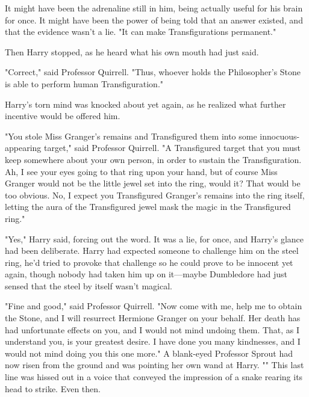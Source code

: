 It might have been the adrenaline still in him, being actually useful for his 
brain for once. It might have been the power of being told that an answer 
existed, and that the evidence wasn't a lie. "It can make Transfigurations 
permanent."

Then Harry stopped, as he heard what his own mouth had just said.

"Correct," said Professor Quirrell. "Thus, whoever holds the Philosopher's 
Stone is able to perform human Transfiguration."

Harry's torn mind was knocked about yet again, as he realized what further 
incentive would be offered him.

"You stole Miss Granger's remains and Transfigured them into some 
innocuous-appearing target," said Professor Quirrell. "A Transfigured target 
that you must keep somewhere about your own person, in order to sustain the 
Transfiguration. Ah, I see your eyes going to that ring upon your hand, but of 
course Miss Granger would not be the little jewel set into the ring, would it? 
That would be too obvious. No, I expect you Transfigured Granger's remains into 
the ring itself, letting the aura of the Transfigured jewel mask the magic in 
the Transfigured ring."

"Yes," Harry said, forcing out the word. It was a lie, for once, and Harry's 
glance had been deliberate. Harry had expected someone to challenge him on the 
steel ring, he'd tried to provoke that challenge so he could prove to be 
innocent yet again, though nobody had taken him up on it---maybe Dumbledore had 
just sensed that the steel by itself wasn't magical.

"Fine and good," said Professor Quirrell. "Now come with me, help me to obtain 
the Stone, and I will resurrect Hermione Granger on your behalf. Her death has 
had unfortunate effects on you, and I would not mind undoing them. That, as I 
understand you, is your greatest desire. I have done you many kindnesses, and I 
would not mind doing you this one more." A blank-eyed Professor Sprout had now 
risen from the ground and was pointing her own wand at Harry. "" This last line was hissed out in a voice that conveyed the impression 
of a snake rearing its head to strike.
\sbreak
Even then.


